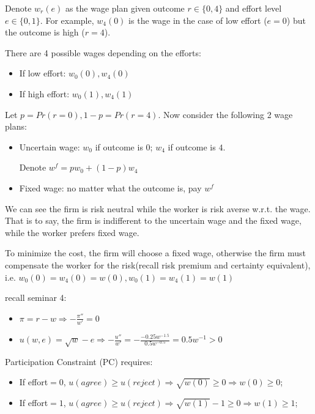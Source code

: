 \documentclass{article}
\begin{document}
\bigskip

Denote $w_r(e)$ as the wage plan given outcome $r \in \{0,4\}$
and effort level $e\in \{0,1\}$. For example, $w_4(0)$ is the wage in the case of low effort ($e=0$) but the outcome is high ($r=4$).

\medskip

There are 4 possible wages depending on the efforts:

\begin{itemize}
\item If low effort: $w_0(0),w_4(0)$
\item If high effort: $w_0(1),w_4(1)$
\end{itemize}

Let $p = Pr(r=0), 1-p = Pr(r=4)$. Now consider the following 2 wage plans:

\begin{itemize}
\item Uncertain wage: $w_0$ if outcome is $0$; $w_4$ if outcome is $4$.

Denote $w^f = pw_0 +(1-p)w_4$
\item Fixed wage: no matter what the outcome is, pay $w^f$
\end{itemize}


We can see the firm is risk neutral while the worker is risk averse w.r.t. the wage. That is to say, the firm is indifferent to the uncertain wage and the fixed wage, while the worker prefers fixed wage.

\medskip

To minimize the cost, the firm will choose a fixed wage, otherwise the firm must compensate the worker for the risk(recall risk premium and certainty equivalent), i.e. $w_0(0)=w_4(0)=w(0), w_0(1)=w_4(1)=w(1)$

\begin{mdframed}[backgroundcolor=blue!20,linecolor=white]
recall seminar 4:
\begin{itemize}
\item  $\pi = r - w \Rightarrow -\frac{\pi''}{w'} = 0$
\item $u(w, e) = \sqrt{w} -e \Rightarrow -\frac{u''}{w'} = -\frac{-0.25w^{-1.5}}{0.5w^{-0.5}} = 0.5w^{-1}>0$
\end{itemize}
\end{mdframed}

Participation Constraint (PC) requires:

\begin{itemize}
\item If effort$=0$, $u(agree) \ge u(reject) \Rightarrow \sqrt{w(0)} \ge 0 \Rightarrow w(0) \ge 0$;
\item If effort$=1$, $u(agree) \ge u(reject) \Rightarrow \sqrt{w(1)} -1 \ge 0 \Rightarrow w(1) \ge 1$;
\end{itemize}
\end{document}

